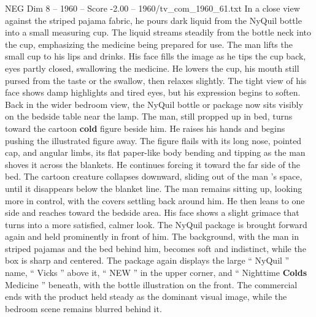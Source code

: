 \begin{textsample}{NEG Dim 8 – 1960 – Score -2.00 – 1960/tv\_com\_1960\_61.txt}
In a close view against the striped pajama fabric, he pours dark liquid from the NyQuil bottle into a small measuring cup.
The liquid streams steadily from the bottle neck into the cup, emphasizing the medicine being prepared for use.
The man lifts the small cup to his lips and drinks.
His face fills the image as he tips the cup back, eyes partly closed, swallowing the medicine.
He lowers the cup, his mouth still pursed from the taste or the swallow, then relaxes slightly.
The tight view of his face shows damp highlights and tired eyes, but his expression begins to soften.
Back in the wider bedroom view, the NyQuil bottle or package now sits visibly on the bedside table near the lamp.
The man, still propped up in bed, turns toward the cartoon \textbf{cold} figure beside him.
He raises his hands and begins pushing the illustrated figure away.
The figure flails with its long nose, pointed cap, and angular limbs, its flat paper-like body bending and tipping as the man shoves it across the blankets.
He continues forcing it toward the far side of the bed.
The cartoon creature collapses downward, sliding out of the man ’s space, until it disappears below the blanket line.
The man remains sitting up, looking more in control, with the covers settling back around him.
He then leans to one side and reaches toward the bedside area.
His face shows a slight grimace that turns into a more satisfied, calmer look.
The NyQuil package is brought forward again and held prominently in front of him.
The background, with the man in striped pajamas and the bed behind him, becomes soft and indistinct, while the box is sharp and centered.
The package again displays the large “ NyQuil ” name, “ Vicks ” above it, “ NEW ” in the upper corner, and “ Nighttime \textbf{Colds} Medicine ” beneath, with the bottle illustration on the front.
The commercial ends with the product held steady as the dominant visual image, while the bedroom scene remains blurred behind it.

\end{textsample}
